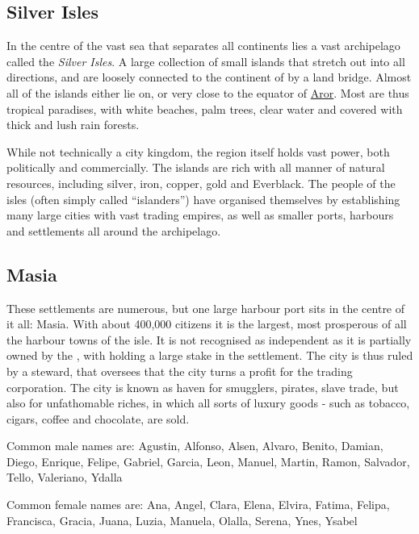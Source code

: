 \subsection{Silver Isles}
\label{sec:Silver Isles}

In the centre of the vast sea that separates all continents lies a vast
archipelago called the \emph{Silver Isles}. A large collection of small
islands that stretch out into all directions, and are loosely connected to the
continent of  by a land bridge. Almost all of the islands
either lie on, or very close to the equator of \hyperref[sec:Aror]{Aror}. Most
are thus tropical paradises, with white beaches, palm trees, clear water and
covered with thick and lush rain forests.

While not technically a city kingdom, the region itself holds vast power,
both politically and commercially. The islands are rich with all manner of
natural resources, including silver, iron, copper, gold and Everblack. The
people of the isles (often simply called ``islanders'') have organised
themselves by establishing many large cities with vast trading empires,
as well as smaller ports, harbours and settlements all around the archipelago.

\subsection{Masia}
\label{sec:Masia}

These settlements are numerous, but one large harbour port sits in the centre
of it all: Masia. With about 400,000 citizens it is the largest, most
prosperous of all the harbour towns of the isle. It is not recognised as
independent as it is partially owned by the , with  holding a large stake in the
settlement. The city is thus ruled by a steward, that oversees that the city
turns a profit for the trading corporation. The city is known as haven for
smugglers, pirates, slave trade, but also for unfathomable riches, in which
all sorts of luxury goods - such as tobacco, cigars, coffee and chocolate, are
sold.

Common male names are: Agustin, Alfonso, Alsen, Alvaro, Benito, Damian, Diego,
Enrique, Felipe, Gabriel, Garcia, Leon, Manuel, Martin, Ramon, Salvador, Tello,
Valeriano, Ydalla

Common female names are: Ana, Angel, Clara, Elena, Elvira, Fatima, Felipa,
Francisca, Gracia, Juana, Luzia, Manuela, Olalla, Serena, Ynes, Ysabel

